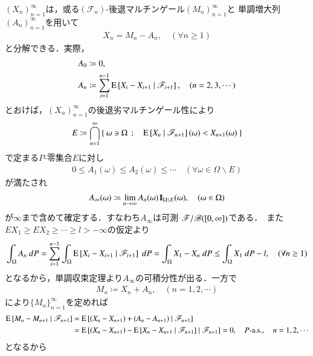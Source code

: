	\begin{prf}
		$(X_n)_{n=1}^\infty$は，或る$(\mathscr{F}_n)$-後退マルチンゲール$(M_n)_{n=1}^\infty$と
		単調増大列$(A_n)_{n=1}^\infty$を用いて
		\begin{align}
			X_n = M_n - A_n,
			\quad (\forall n \geq 1)
		\end{align}
		と分解できる．実際，
		\begin{align}
			A_0 &\coloneqq 0, \\
			A_n &\coloneqq \sum_{i=1}^{n-1} \operatorname{E} \left[ X_i - X_{i+1} \ \middle|\ \mathscr{F}_{i+1} \right],
			\quad (n=2,3,\cdots)
		\end{align}
		とおけば，$(X_n)_{n=1}^\infty$の後退劣マルチンゲール性により
		\begin{align}
			E \coloneqq \bigcap_{n=1}^\infty \left\{\ \omega \ni \Omega\ \, ; \quad \operatorname{E} \left[ X_n \ \middle|\ \mathscr{F}_{n+1} \right](\omega) < X_{n+1}(\omega)\ \right\}
		\end{align}
		で定まる$P$-零集合$E$に対し
		\begin{align}
			0 \leq A_1(\omega) \leq A_2(\omega) \leq \cdots \quad (\forall \omega \in \Omega \backslash E)
		\end{align}
		が満たされ
		\begin{align}
			A_\infty(\omega) \coloneqq \lim_{n \to \infty} A_n(\omega) \mbox{1}\hspace{-0.25em}\mbox{l}_{\Omega \backslash E}(\omega),
			\quad (\omega \in \Omega)
		\end{align}
		が$\infty$まで含めて確定する．すなわち$A_\infty$は可測
		$\mathscr{F}/\mathscr{B}([0,\infty])$である．\
		また$EX_1 \geq EX_2 \geq \cdots \geq l > -\infty$の仮定より
		\begin{align}
			\int_\Omega A_n\ dP
			= \sum_{i=1}^{n-1} \int_{\Omega} \operatorname{E} \left[ X_i - X_{i+1} \ \middle|\ \mathscr{F}_{i+1} \right]\ dP
			= \int_\Omega X_1 - X_n\ dP
			\leq \int_\Omega X_1\ dP - l,
			\quad (\forall n \geq 1)
		\end{align}
		となるから，単調収束定理より$A_\infty$の可積分性が出る．一方で
		\begin{align}
			M_n \coloneqq X_n + A_n,
			\quad (n = 1,2,\cdots)
		\end{align}
		により$\{M_n\}_{n=1}^\infty$を定めれば
		\begin{align}
			\operatorname{E} \left[ M_n - M_{n+1} \ \middle|\ \mathscr{F}_{n+1} \right]
			&= \operatorname{E} \left[ (X_n - X_{n+1}) + (A_n - A_{n+1}) \ \middle|\ \mathscr{F}_{n+1} \right] \\
			&= \operatorname{E} \left[ (X_n - X_{n+1}) - \operatorname{E} \left[ X_n - X_{n+1} \ \middle|\ \mathscr{F}_{n+1} \right] \ \middle|\ \mathscr{F}_{n+1} \right]
			= 0,
			\quad \mbox{$P$-a.s.},
			\quad n=1,2,\cdots
		\end{align}
		となるから
		\begin{align}

\end{align}
\end{prf}
